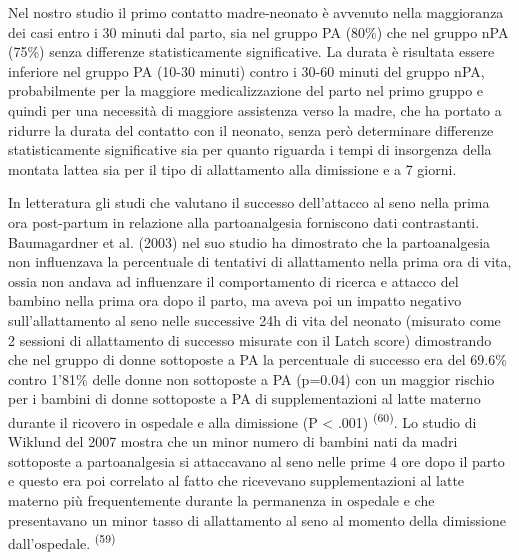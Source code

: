 \documentclass[]{article}
\begin{document}
Nel nostro studio il primo contatto madre-neonato è avvenuto nella
maggioranza dei casi entro i 30 minuti dal parto, sia nel gruppo PA
(80\%) che nel gruppo nPA (75\%) senza differenze statisticamente
significative. La durata è risultata essere inferiore nel gruppo PA
(10-30 minuti) contro i 30-60 minuti del gruppo nPA, probabilmente per
la maggiore medicalizzazione del parto nel primo gruppo e quindi per una
necessità di maggiore assistenza verso la madre, che ha portato a
ridurre la durata del contatto con il neonato, senza però determinare
differenze statisticamente significative sia per quanto riguarda i tempi
di insorgenza della montata lattea sia per il tipo di allattamento alla
dimissione e a 7 giorni.

In letteratura gli studi che valutano il successo dell'attacco al seno
nella prima ora post-partum in relazione alla partoanalgesia forniscono
dati contrastanti. Baumagardner et al. (2003) nel suo studio ha
dimostrato che la partoanalgesia non influenzava la percentuale di
tentativi di allattamento nella prima ora di vita, ossia non andava ad
influenzare il comportamento di ricerca e attacco del bambino nella
prima ora dopo il parto, ma aveva poi un impatto negativo
sull'allattamento al seno nelle successive 24h di vita del neonato
(misurato come 2 sessioni di allattamento di successo misurate con il
Latch score) dimostrando che nel gruppo di donne sottoposte a PA la
percentuale di successo era del 69.6\% contro 1'81\% delle donne non
sottoposte a PA (p=0.04) con un maggior rischio per i bambini di donne
sottoposte a PA di supplementazioni al latte materno durante il ricovero
in ospedale e alla dimissione (P \textless{} .001)
\textsuperscript{(60)}. Lo studio di Wiklund del 2007 mostra che un
minor numero di bambini nati da madri sottoposte a partoanalgesia si
attaccavano al seno nelle prime 4 ore dopo il parto e questo era poi
correlato al fatto che ricevevano supplementazioni al latte materno più
frequentemente durante la permanenza in ospedale e che presentavano un
minor tasso di allattamento al seno al momento della dimissione
dall'ospedale. \textsuperscript{(59)}
\end{document}
